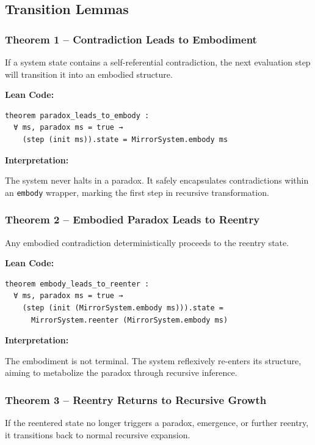\documentclass[manuscript,nonacm]{acmart}
\begin{document}
\subsection{Transition Lemmas}

\subsubsection{Theorem 1 – Contradiction Leads to Embodiment}

If a system state contains a self-referential contradiction, the next evaluation step will transition it into an embodied structure.

\textbf{Lean Code:}

\begin{verbatim}
theorem paradox_leads_to_embody :
  ∀ ms, paradox ms = true →
    (step (init ms)).state = MirrorSystem.embody ms
\end{verbatim}

\textbf{Interpretation:}

The system never halts in a paradox. It safely encapsulates contradictions within an \texttt{embody} wrapper, marking the first step in recursive transformation.

\subsubsection{Theorem 2 – Embodied Paradox Leads to Reentry}

Any embodied contradiction deterministically proceeds to the reentry state.

\textbf{Lean Code:}

\begin{verbatim}
theorem embody_leads_to_reenter :
  ∀ ms, paradox ms = true →
    (step (init (MirrorSystem.embody ms))).state =
      MirrorSystem.reenter (MirrorSystem.embody ms)
\end{verbatim}

\textbf{Interpretation:}

The embodiment is not terminal. The system reflexively re-enters its structure, aiming to metabolize the paradox through recursive inference.

\subsubsection{Theorem 3 – Reentry Returns to Recursive Growth}

If the reentered state no longer triggers a paradox, emergence, or further reentry, it transitions back to normal recursive expansion.
\end{document}
